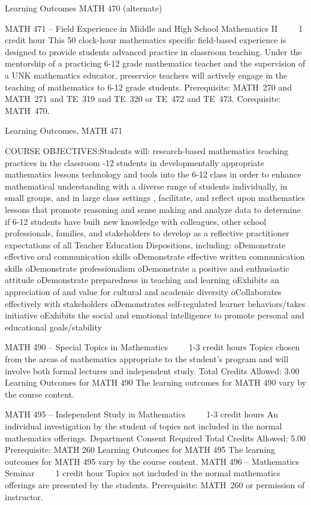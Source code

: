 Learning Outcomes MATH 470 (alternate)

MATH 471 – Field Experience in Middle and High School Mathematics II     1 credit hour
This 50 clock-hour mathematics specific field-based experience is designed to provide students advanced practice in classroom teaching. Under the mentorship of a practicing 6-12 grade mathematics teacher and the supervision of a UNK mathematics educator, preservice teachers will actively engage in the teaching of mathematics to 6-12 grade students.
Prerequisite: MATH 270 and MATH 271 and TE 319 and TE 320 or TE 472 and TE 473. 
Corequisite: MATH 470.

Learning Outcomes, MATH 471

COURSE OBJECTIVES:Students will:
\itemUtilize research-based mathematics teaching practices in the classroom
-12 students in developmentally appropriate mathematics lessons
\itemIncorporate technology and tools into the 6-12 class in order to enhance mathematical understanding
\itemWork with a diverse range of students individually, in small groups, and in large class settings
\itemPlan, facilitate, and reflect upon mathematics lessons that promote reasoning and sense making
\itemCollect and analyze data to determine if 6-12 students have built new knowledge 
\itemCollaborate with colleagues, other school professionals, families, and stakeholders
\itemContinue to develop as a reflective practitioner
\itemMeet expectations of all Teacher Education Dispositions, including:
oDemonstrate effective oral communication skills
oDemonstrate effective written communication skills
oDemonstrate professionalism
oDemonstrate a positive and enthusiastic attitude
oDemonstrate preparedness in teaching and learning
oExhibits an appreciation of and value for cultural and academic diversity
oCollaborates effectively with stakeholders
oDemonstrates self-regulated learner behaviors/takes initiative
oExhibits the social and emotional intelligence to promote personal and educational goals/stability

MATH 490 – Special Topics in Mathematics     1-3 credit hours
Topics chosen from the areas of mathematics appropriate to the student's program and will involve both formal lectures and independent study.
Total Credits Allowed: 3.00
Learning Outcomes for MATH 490
The learning outcomes for MATH 490 vary by the course content.

MATH 495 – Independent Study in Mathematics     1-3 credit hours
An individual investigation by the student of topics not included in the normal mathematics offerings.
Department Consent Required
Total Credits Allowed: 5.00
Prerequisite: MATH 260
Learning Outcomes for MATH 495
The learning outcomes for MATH 495 vary by the course content.
MATH 496 – Mathematics Seminar     1 credit hour
Topics not included in the normal mathematics offerings are presented by the students.
Prerequisite: MATH 260 or permission of instructor.

